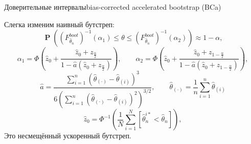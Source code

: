 \documentclass[11pt,pdf,utf8,hyperref={unicode},aspectratio=169]{beamer}
\DeclareMathOperator{\prob}{\mathbf{P}}
\begin{document}
\begin{frame}{Доверительные интервалы}{bias-corrected accelerated bootstrap (BCa)}

    Слегка изменим наивный бутстреп:
	$$
        \prob\left(\left(F_{\hat{\theta}_n}^{boot}\right)^{-1}\left(\alpha_1\right) \leq \theta \leq \left(F_{\hat{\theta}_n}^{boot}\right)^{-1}\left(\alpha_2\right) \right)\approx 1-\alpha,
    $$
    \vspace{-10pt}
    $$
        \alpha_1  = \Phi\left(\hat{z}_0 + \frac{\hat{z}_0 + z_{\frac{\alpha}{2}}}{1 - \hat{a} \left(\hat{z}_0 + z_{\frac{\alpha}{2}}\right)}\right),
        \qquad
        \alpha_2  = \Phi\left(\hat{z}_0 + \frac{\hat{z}_0 + z_{1-\frac{\alpha}{2}}}{1 - \hat{a} \left(\hat{z}_0 + z_{1-\frac{\alpha}{2}} \right)} \right),
    $$
    $$
        \hat{a} =
        \frac{\sum_{i=1}^n (\hat{\theta}_{(\cdot)} - \hat{\theta}_{(i)})^3}%
        {6\left(\sum_{i=1}^n (\hat{\theta}_{(\cdot)} - \hat{\theta}_{(i)})^2\right)^{3/2}},
        \qquad
        \hat\theta_{(\cdot)} = \frac{1}{n}\sum_{i=1}^n \hat\theta_{(i)}
    $$
    $$
        \hat{z}_0 = \Phi^{-1} \left(\frac1{N} \sum_{i=1}^N \left[ \hat{\theta}_n^{i*} < \hat{\theta}_n\right]\right),
	$$
			Это несмещённый ускоренный бутстреп.
\end{frame}
\end{document}
